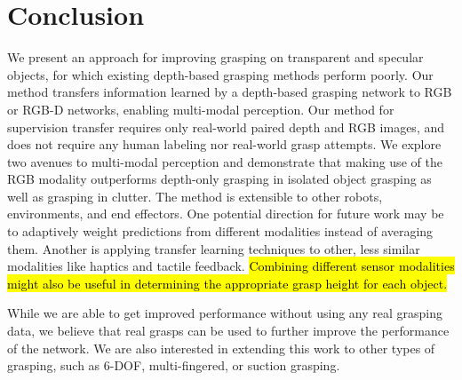 \section{Conclusion}
\label{sec:conclusion}

We present an approach for improving grasping on transparent and specular objects, for which existing depth-based grasping methods perform poorly. 
Our method transfers information learned by a depth-based grasping network to RGB or RGB-D networks, enabling multi-modal perception. 
Our method for supervision transfer requires only real-world paired depth and RGB images, and does not require any human labeling nor real-world grasp attempts. 
We explore two avenues to multi-modal perception and demonstrate that making use of the RGB modality outperforms depth-only grasping in isolated object grasping as well as grasping in clutter.
The method is extensible to other robots, environments, and end effectors. 
One potential direction for future work may be to adaptively weight predictions from different modalities instead of averaging them.
Another is applying transfer learning techniques to other, less similar modalities like haptics and tactile feedback. \hl{Combining different sensor modalities might also be useful in determining the appropriate grasp height for each object.}

While we are able to get improved performance without using any real grasping data, we believe that real grasps can be used to further improve the performance of the network. We are also interested in extending this work to other types of grasping, such as 6-DOF, multi-fingered, or suction grasping.